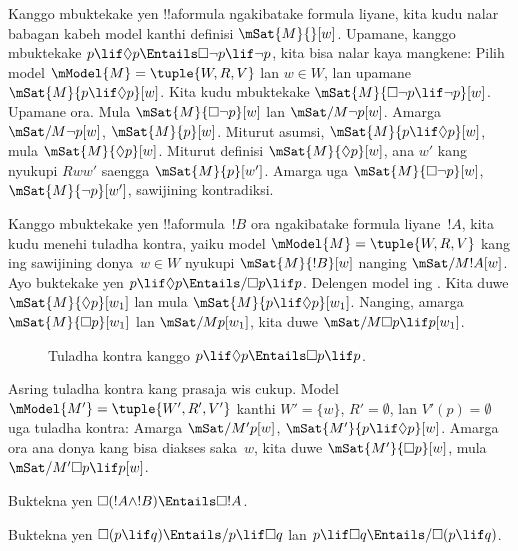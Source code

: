 \documentclass[../../../include/open-logic-section]{subfiles}
\begin{document}
\begin{ex}
  Kanggo mbuktekake yen !!a{formula} ngakibatake formula liyane, kita kudu
  nalar babagan kabeh model kanthi definisi $\mSat{M}{}[w]$. Upamane,
  kanggo mbuktekake $p \lif \Diamond p \Entails \Box\lnot p \lif \lnot p$,
  kita bisa nalar kaya mangkene: Pilih model $\mModel{M} = \tuple{W, R,
    V}$ lan $w \in W$, lan upamane $\mSat{M}{p \lif \Diamond
    p}[w]$. Kita kudu mbuktekake $\mSat{M}{\Box\lnot p \lif \lnot
    p}[w]$. Upamane ora. Mula $\mSat{M}{\Box\lnot p}[w]$ lan
  $\mSat/{M}{\lnot p}[w]$. Amarga $\mSat/{M}{\lnot p}[w]$, $\mSat{M}{
    p}[w]$. Miturut asumsi, $\mSat{M}{p \lif \Diamond p}[w]$, mula
  $\mSat{M}{\Diamond p}[w]$. Miturut definisi $\mSat{M}{\Diamond
    p}[w]$, ana $w'$ kang nyukupi $Rww'$ saengga
  $\mSat{M}{p}[w']$. Amarga uga $\mSat{M}{\Box \lnot p}[w]$,
  $\mSat{M}{\lnot p}[w']$, sawijining kontradiksi.

Kanggo mbuktekake yen !!a{formula}~$!B$ ora ngakibatake formula
  liyane~$!A$, kita kudu menehi tuladha kontra, yaiku model
  $\mModel{M} = \tuple{W, R,
    V}$ kang ing sawijining donya~$w \in W$ nyukupi $\mSat{M}{!B}[w]$
  nanging $\mSat/{M}{!A}[w]$. Ayo buktekake yen $p \lif \Diamond p \Entails/
  \Box p \lif p$. Delengen model ing . Kita
  duwe $\mSat{M}{\Diamond p}[w_1]$ lan mula $\mSat{M}{p \lif
    \Diamond p}[w_1]$. Nanging, amarga $\mSat{M}{\Box p}[w_1]$ lan
  $\mSat/{M}{p}[w_1]$, kita duwe $\mSat/{M}{\Box p \lif p}[w_1]$.
  \begin{figure}
  \begin{center}
  \end{center}
  \caption{Tuladha kontra kanggo $p \lif \Diamond p
  \Entails \Box p \lif p$.}
  \end{figure}

Asring tuladha kontra kang prasaja wis cukup. Model $\mModel{M'} =
  \tuple{W', R', V'}$ kanthi $W' = \{w\}$, $R' = \emptyset$, lan $V'(p) =
  \emptyset$ uga tuladha kontra: Amarga $\mSat/{M'}{p}[w]$,
  $\mSat{M'}{p \lif \Diamond p}[w]$. Amarga ora ana donya kang bisa diakses
  saka~$w$, kita duwe $\mSat{M'}{\Box p}[w]$, mula $\mSat/{M'}{\Box p
    \lif p}[w]$.
\end{ex}

\begin{prob}
  Buktekna yen $\Box (!A \land !B) \Entails \Box !A$.
\end{prob}

\begin{prob}
  Buktekna yen $\Box (p \lif q) \Entails/ p \lif \Box q$ lan $p \lif \Box
  q \Entails/\Box (p \lif q)$.
\end{prob}
\end{document}

